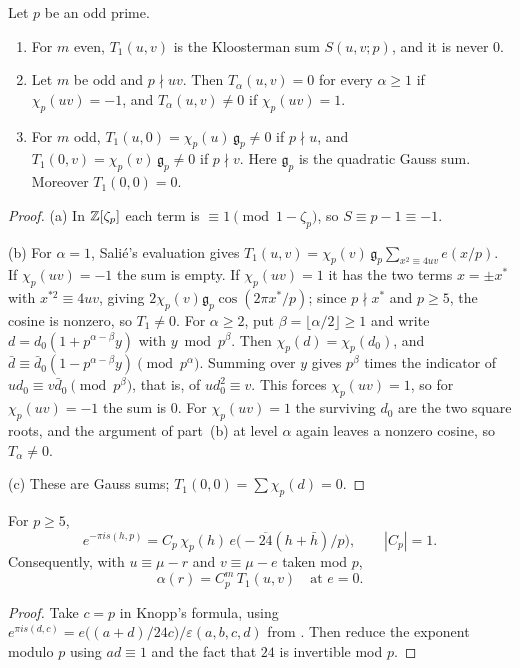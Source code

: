 \documentclass[11pt]{amsart}
\theoremstyle{definition}\newtheorem{definition}[theorem]{Definition}
\theoremstyle{remark}\newtheorem{remark}[theorem]{Remark}
\begin{document}
\begin{lemma}\label{lem:salie}
Let $p$ be an odd prime.
\begin{enumerate}[label=(\alph*),leftmargin=2em]
\item For $m$ even, $T_1(u,v)$ is the Kloosterman sum $S(u,v;p)$, and it is never $0$.
\item Let $m$ be odd and $p\nmid uv$. Then $T_\alpha(u,v)=0$ for every $\alpha\ge1$ if $\chi_p(uv)=-1$, and $T_\alpha(u,v)\ne0$ if $\chi_p(uv)=1$.
\item For $m$ odd, $T_1(u,0)=\chi_p(u)\,\mathfrak g_p\ne0$ if $p\nmid u$, and $T_1(0,v)=\chi_p(v)\,\mathfrak g_p\ne0$ if $p\nmid v$. Here $\mathfrak g_p$ is the quadratic Gauss sum. Moreover $T_1(0,0)=0$.
\end{enumerate}
\end{lemma}
\begin{proof}
(a) In $\mathbb Z[\zeta_p]$ each term is $\equiv1\pmod{1-\zeta_p}$, so $S\equiv p-1\equiv-1$.

(b) For $\alpha=1$, Sali\'e's evaluation gives $T_1(u,v)=\chi_p(v)\,\mathfrak g_p\sum_{x^2\equiv4uv}e(x/p)$. If $\chi_p(uv)=-1$ the sum is empty. If $\chi_p(uv)=1$ it has the two terms $x=\pm x^\ast$ with $x^{\ast2}\equiv4uv$, giving $2\chi_p(v)\mathfrak g_p\cos(2\pi x^\ast/p)$; since $p\nmid x^\ast$ and $p\ge5$, the cosine is nonzero, so $T_1\ne0$. For $\alpha\ge2$, put $\beta=\lfloor\alpha/2\rfloor\ge1$ and write $d=d_0(1+p^{\alpha-\beta}y)$ with $y\bmod p^\beta$. Then $\chi_p(d)=\chi_p(d_0)$, and $\bar d\equiv\bar d_0(1-p^{\alpha-\beta}y)\pmod{p^\alpha}$. Summing over $y$ gives $p^\beta$ times the indicator of $ud_0\equiv v\bar d_0\pmod{p^\beta}$, that is, of $ud_0^2\equiv v$. This forces $\chi_p(uv)=1$, so for $\chi_p(uv)=-1$ the sum is $0$. For $\chi_p(uv)=1$ the surviving $d_0$ are the two square roots, and the argument of part~(b) at level $\alpha$ again leaves a nonzero cosine, so $T_\alpha\ne0$.

(c) These are Gauss sums; $T_1(0,0)=\sum\chi_p(d)=0$.
\end{proof}

\begin{lemma}[multiplier at $c=p$]\label{lem:multp}
For $p\ge5$,
\[
e^{-\pi is(h,p)}=C_p\,\chi_p(h)\,e\big(-\overline{24}(h+\bar h)/p\big),\qquad |C_p|=1 .
\]
Consequently, with $u\equiv\mu-r$ and $v\equiv\mu-e$ taken mod $p$,
\[
\alpha(r)=C_p^m\,T_1(u,v)\quad\text{at } e=0 .
\]
\end{lemma}
\begin{proof}
Take $c=p$ in Knopp's formula, using $e^{\pi is(d,c)}=e\big((a+d)/24c\big)/\varepsilon(a,b,c,d)$ from \cite[Thm.~3.4]{Ap}. Then reduce the exponent modulo $p$ using $ad\equiv1$ and the fact that $24$ is invertible mod $p$.
\end{proof}
\end{document}
